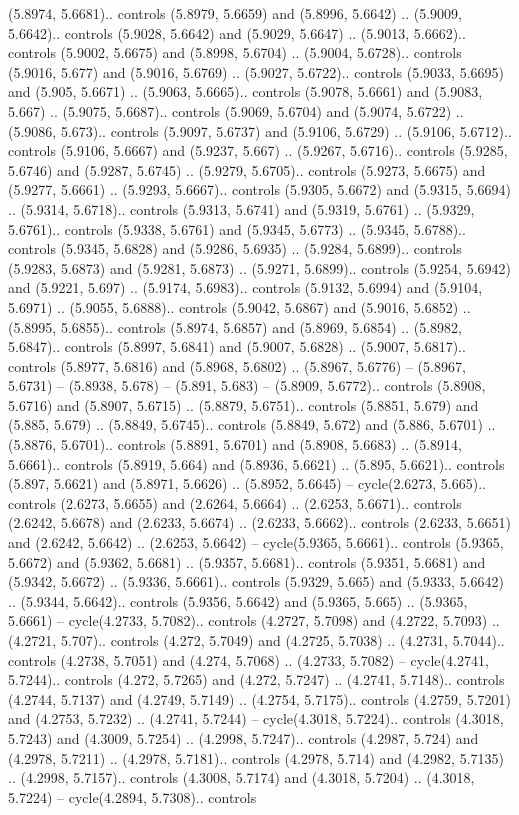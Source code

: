 (5.8974, 5.6681).. controls (5.8979, 5.6659) and (5.8996, 5.6642) .. (5.9009, 5.6642).. controls (5.9028, 5.6642) and (5.9029, 5.6647) .. (5.9013, 5.6662).. controls (5.9002, 5.6675) and (5.8998, 5.6704) .. (5.9004, 5.6728).. controls (5.9016, 5.677) and (5.9016, 5.6769) .. (5.9027, 5.6722).. controls (5.9033, 5.6695) and (5.905, 5.6671) .. (5.9063, 5.6665).. controls (5.9078, 5.6661) and (5.9083, 5.667) .. (5.9075, 5.6687).. controls (5.9069, 5.6704) and (5.9074, 5.6722) .. (5.9086, 5.673).. controls (5.9097, 5.6737) and (5.9106, 5.6729) .. (5.9106, 5.6712).. controls (5.9106, 5.6667) and (5.9237, 5.667) .. (5.9267, 5.6716).. controls (5.9285, 5.6746) and (5.9287, 5.6745) .. (5.9279, 5.6705).. controls (5.9273, 5.6675) and (5.9277, 5.6661) .. (5.9293, 5.6667).. controls (5.9305, 5.6672) and (5.9315, 5.6694) .. (5.9314, 5.6718).. controls (5.9313, 5.6741) and (5.9319, 5.6761) .. (5.9329, 5.6761).. controls (5.9338, 5.6761) and (5.9345, 5.6773) .. (5.9345, 5.6788).. controls (5.9345, 5.6828) and (5.9286, 5.6935) .. (5.9284, 5.6899).. controls (5.9283, 5.6873) and (5.9281, 5.6873) .. (5.9271, 5.6899).. controls (5.9254, 5.6942) and (5.9221, 5.697) .. (5.9174, 5.6983).. controls (5.9132, 5.6994) and (5.9104, 5.6971) .. (5.9055, 5.6888).. controls (5.9042, 5.6867) and (5.9016, 5.6852) .. (5.8995, 5.6855).. controls (5.8974, 5.6857) and (5.8969, 5.6854) .. (5.8982, 5.6847).. controls (5.8997, 5.6841) and (5.9007, 5.6828) .. (5.9007, 5.6817).. controls (5.8977, 5.6816) and (5.8968, 5.6802) .. (5.8967, 5.6776) -- (5.8967, 5.6731) -- (5.8938, 5.678) -- (5.891, 5.683) -- (5.8909, 5.6772).. controls (5.8908, 5.6716) and (5.8907, 5.6715) .. (5.8879, 5.6751).. controls (5.8851, 5.679) and (5.885, 5.679) .. (5.8849, 5.6745).. controls (5.8849, 5.672) and (5.886, 5.6701) .. (5.8876, 5.6701).. controls (5.8891, 5.6701) and (5.8908, 5.6683) .. (5.8914, 5.6661).. controls (5.8919, 5.664) and (5.8936, 5.6621) .. (5.895, 5.6621).. controls (5.897, 5.6621) and (5.8971, 5.6626) .. (5.8952, 5.6645) -- cycle(2.6273, 5.665).. controls (2.6273, 5.6655) and (2.6264, 5.6664) .. (2.6253, 5.6671).. controls (2.6242, 5.6678) and (2.6233, 5.6674) .. (2.6233, 5.6662).. controls (2.6233, 5.6651) and (2.6242, 5.6642) .. (2.6253, 5.6642) -- cycle(5.9365, 5.6661).. controls (5.9365, 5.6672) and (5.9362, 5.6681) .. (5.9357, 5.6681).. controls (5.9351, 5.6681) and (5.9342, 5.6672) .. (5.9336, 5.6661).. controls (5.9329, 5.665) and (5.9333, 5.6642) .. (5.9344, 5.6642).. controls (5.9356, 5.6642) and (5.9365, 5.665) .. (5.9365, 5.6661) -- cycle(4.2733, 5.7082).. controls (4.2727, 5.7098) and (4.2722, 5.7093) .. (4.2721, 5.707).. controls (4.272, 5.7049) and (4.2725, 5.7038) .. (4.2731, 5.7044).. controls (4.2738, 5.7051) and (4.274, 5.7068) .. (4.2733, 5.7082) -- cycle(4.2741, 5.7244).. controls (4.272, 5.7265) and (4.272, 5.7247) .. (4.2741, 5.7148).. controls (4.2744, 5.7137) and (4.2749, 5.7149) .. (4.2754, 5.7175).. controls (4.2759, 5.7201) and (4.2753, 5.7232) .. (4.2741, 5.7244) -- cycle(4.3018, 5.7224).. controls (4.3018, 5.7243) and (4.3009, 5.7254) .. (4.2998, 5.7247).. controls (4.2987, 5.724) and (4.2978, 5.7211) .. (4.2978, 5.7181).. controls (4.2978, 5.714) and (4.2982, 5.7135) .. (4.2998, 5.7157).. controls (4.3008, 5.7174) and (4.3018, 5.7204) .. (4.3018, 5.7224) -- cycle(4.2894, 5.7308).. controls 